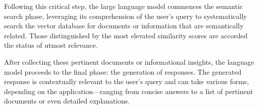 \documentclass[conference]{IEEEtran}
\begin{document}
Following this critical step, the large language model commences the semantic search phase, leveraging its comprehension of the user's query to systematically search the vector database for documents or information that are semantically related. Those distinguished by the most elevated similarity scores are accorded the status of utmost relevance.

After collecting these pertinent documents or informational insights, the language model proceeds to the final phase: the generation of responses. The generated response is contextually relevant to the user's query and can take various forms, depending on the application—ranging from concise answers to a list of pertinent documents or even detailed explanations.












\end{document}
